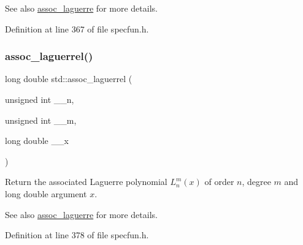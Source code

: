 \begin{DoxySeeAlso}{See also}
\hyperlink{group__tr29124__math__spec__func_ga87158c36cc84c104a3b23582829d8831}{assoc\+\_\+laguerre} for more details. 
\end{DoxySeeAlso}


Definition at line 367 of file specfun.\+h.

\mbox{\label{group__tr29124__math__spec__func_gac8e245671fb2df5de5fd978d03081f6c}} 
\subsubsection{\texorpdfstring{assoc\+\_\+laguerrel()}{assoc\_laguerrel()}}
{\footnotesize\ttfamily long double std\+::assoc\+\_\+laguerrel (\begin{DoxyParamCaption}\item[{unsigned int}]{\+\_\+\+\_\+n,  }\item[{unsigned int}]{\+\_\+\+\_\+m,  }\item[{long double}]{\+\_\+\+\_\+x }\end{DoxyParamCaption})\hspace{0.3cm}{\ttfamily [inline]}}

Return the associated Laguerre polynomial $ L_n^m(x) $ of order $ n $, degree $ m $ and {\ttfamily long double} argument $ x $.

\begin{DoxySeeAlso}{See also}
\hyperlink{group__tr29124__math__spec__func_ga87158c36cc84c104a3b23582829d8831}{assoc\+\_\+laguerre} for more details. 
\end{DoxySeeAlso}


Definition at line 378 of file specfun.\+h.

\mbox{\label{group__tr29124__math__spec__func_ga9df2525c1155eb8539e85323f18361a3}} 
